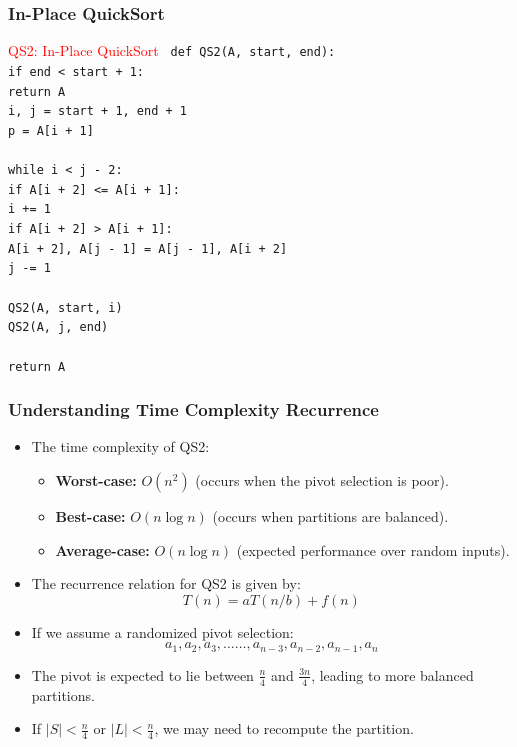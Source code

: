 \begin{frame}
    \frametitle{In-Place QuickSort}
    \begin{block}{\textcolor{red}{QS2: In-Place QuickSort}}
        \texttt{
        def QS2(A, start, end): \\
        \quad if end < start + 1: \\
        \quad \quad return A \\
        \quad i, j = start + 1, end + 1 \\
        \quad p = A[i + 1] \\
        \\
        \quad while i < j - 2: \\
        \quad \quad if A[i + 2] <= A[i + 1]: \\
        \quad \quad \quad i += 1 \\
        \quad \quad if A[i + 2] > A[i + 1]: \\
        \quad \quad \quad A[i + 2], A[j - 1] = A[j - 1], A[i + 2] \\
        \quad \quad \quad j -= 1 \\
        \\
        \quad QS2(A, start, i) \\
        \quad QS2(A, j, end) \\
        \\
        \quad return A
        }
    \end{block}
\end{frame}


\begin{frame}
    \frametitle{Understanding Time Complexity Recurrence}
    \begin{itemize}
        \item The time complexity of QS2:
        \begin{itemize}
            \item \textbf{Worst-case:} \( O(n^2) \) (occurs when the pivot selection is poor).
            \item \textbf{Best-case:} \( O(n \log n) \) (occurs when partitions are balanced).
            \item \textbf{Average-case:} \( O(n \log n) \) (expected performance over random inputs).
        \end{itemize}
        
        \item The recurrence relation for QS2 is given by:
        \[
        T(n) = aT(n/b) + f(n)
        \]
        \item If we assume a randomized pivot selection:
        \[
        a_1, a_2, a_3, \dots\dots, a_{n-3}, a_{n-2}, a_{n-1}, a_n
        \]
        \item The pivot is expected to lie between \( \frac{n}{4} \) and \( \frac{3n}{4} \), leading to more balanced partitions.
        \item If \( |S| < \frac{n}{4} \) or \( |L| < \frac{n}{4} \), we may need to recompute the partition.
    \end{itemize}
\end{frame}

